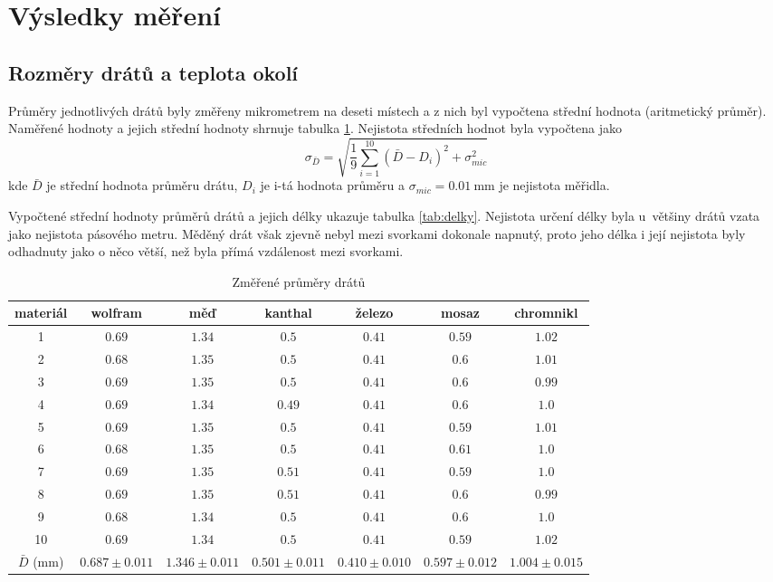 \documentclass{../concepts/prepareprotokol} %
\begin{document}
\section{Výsledky měření}

\subsection{Rozměry drátů a teplota okolí} \label{rozmery}

Průměry jednotlivých drátů byly změřeny mikrometrem na deseti místech a z nich byl 
vypočtena střední hodnota (aritmetický průměr). Naměřené hodnoty a jejich střední 
hodnoty shrnuje tabulka \ref{tab:prumer}. Nejistota středních hodnot byla vypočtena jako 
\begin{equation}
    \sigma_{\bar{D}} = \sqrt{\frac{1}{9} \sum_{i=1}^{10} (\bar{D} - D_i)^2 + \sigma_{mic}^2} \,
\end{equation}
kde $\bar{D}$ je střední hodnota průměru drátu, $D_i$ je i-tá hodnota průměru a 
$\sigma_{mic}=\SI{0.01}{\milli\metre}$ je nejistota měřidla.

Vypočtené střední hodnoty průměrů drátů a jejich délky ukazuje tabulka \ref{tab:delky}. 
Nejistota určení délky byla u~většiny drátů vzata jako nejistota pásového metru. Měděný 
drát však zjevně nebyl mezi svorkami dokonale napnutý, proto jeho délka i její nejistota 
byly odhadnuty jako o něco větší, než byla přímá vzdálenost mezi svorkami.

\begin{table}[!hbtp]
\centering
\caption{Změřené průměry drátů}
\begin{tabular}{c|cccccc}
 \toprule
 materiál & wolfram & měď & kanthal & železo & mosaz & chromnikl \\
 \midrule

 1 & $0.69$ & $1.34$ & $0.5$ & $0.41$ & $0.59$ & $1.02$ \\
 2 & $0.68$ & $1.35$ & $0.5$ & $0.41$ & $0.6$ & $1.01$ \\
 3 & $0.69$ & $1.35$ & $0.5$ & $0.41$ & $0.6$ & $0.99$ \\
 4 & $0.69$ & $1.34$ & $0.49$ & $0.41$ & $0.6$ & $1.0$ \\
 5 & $0.69$ & $1.35$ & $0.5$ & $0.41$ & $0.59$ & $1.01$ \\
 6 & $0.68$ & $1.35$ & $0.5$ & $0.41$ & $0.61$ & $1.0$ \\
 7 & $0.69$ & $1.35$ & $0.51$ & $0.41$ & $0.59$ & $1.0$ \\
 8 & $0.69$ & $1.35$ & $0.51$ & $0.41$ & $0.6$ & $0.99$ \\
 9 & $0.68$ & $1.34$ & $0.5$ & $0.41$ & $0.6$ & $1.0$ \\
 10 & $0.69$ & $1.34$ & $0.5$ & $0.41$ & $0.59$ & $1.02$ \\
 \midrule
 $\bar{D}$ (mm) & $0.687 \pm 0.011$ & $1.346 \pm 0.011$ & $0.501 \pm 0.011$ & $0.410 \pm 0.010$ & $0.597 \pm 0.012$ & $1.004 \pm 0.015$ \\
 
 \bottomrule
\end{tabular}
\label{tab:prumer}
\end{table}
\end{document}
